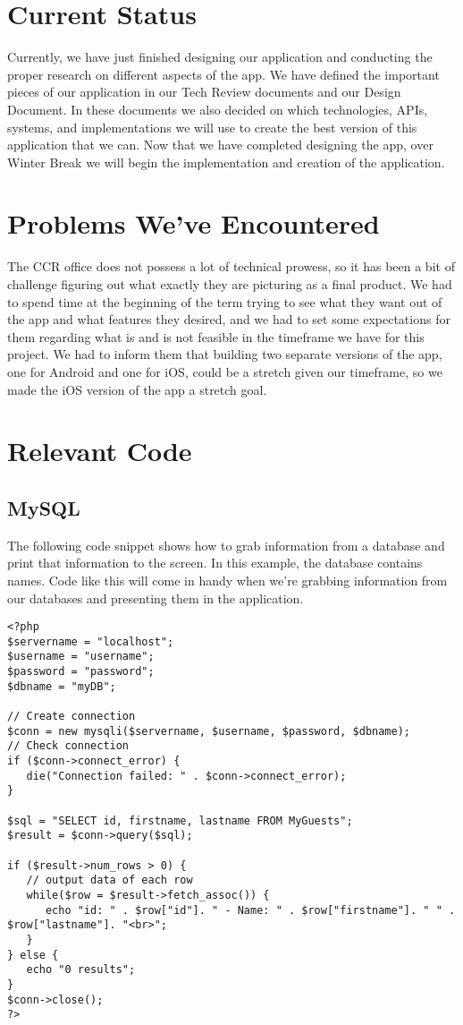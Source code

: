 \documentclass[draftclsnofoot, onecolumn, 10pt, compsoc]{IEEEtran}
\begin{document}
   \section{Current Status}
   Currently, we have just finished designing our application and conducting the proper research on different aspects of the app. We have defined the important pieces of our application in our Tech Review documents and our Design Document. In these documents we also decided on which technologies, APIs, systems, and implementations we will use to create the best version of this application that we can. Now that we have completed designing the app, over Winter Break we will begin the implementation and creation of the application.

   \section{Problems We've Encountered}
   The CCR office does not possess a lot of technical prowess, so it has been a bit of challenge figuring out what exactly they are picturing as a final product. We had to spend time at the beginning of the term trying to see what they want out of the app and what features they desired, and we had to set some expectations for them regarding what is and is not feasible in the timeframe we have for this project. We had to inform them that building two separate versions of the app, one for Android and one for iOS, could be a stretch given our timeframe, so we made the iOS version of the app a stretch goal.

   \section{Relevant Code}
      \subsection{MySQL}
      The following code snippet shows how to grab information from a database and print that information to the screen. In this example, the database contains names. Code like this will come in handy when we're grabbing information from our databases and presenting them in the application.
      \begin{lstlisting}[style=php]
<?php
$servername = "localhost";
$username = "username";
$password = "password";
$dbname = "myDB";

// Create connection
$conn = new mysqli($servername, $username, $password, $dbname);
// Check connection
if ($conn->connect_error) {
   die("Connection failed: " . $conn->connect_error);
}

$sql = "SELECT id, firstname, lastname FROM MyGuests";
$result = $conn->query($sql);

if ($result->num_rows > 0) {
   // output data of each row
   while($row = $result->fetch_assoc()) {
      echo "id: " . $row["id"]. " - Name: " . $row["firstname"]. " " . $row["lastname"]. "<br>";
   }
} else {
   echo "0 results";
}
$conn->close();
?>
      \end{lstlisting}
      ~\cite{MySQL}
\end{document}
